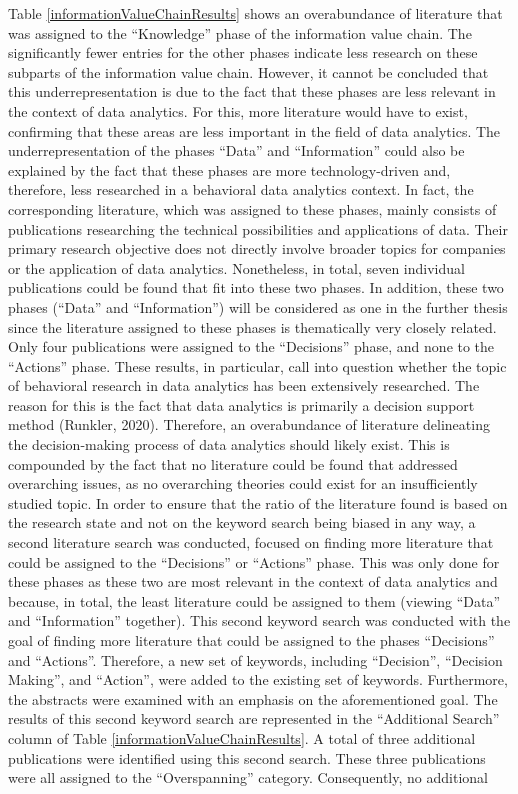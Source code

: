 Table \ref{informationValueChainResults} shows an overabundance of literature that was assigned to the \enquote{Knowledge} phase of the information value chain. The significantly fewer entries for the other phases indicate less research on these subparts of the information value chain. However, it cannot be concluded that this underrepresentation is due to the fact that these phases are less relevant in the context of data analytics. For this, more literature would have to exist, confirming that these areas are less important in the field of data analytics. The underrepresentation of the phases \enquote{Data} and \enquote{Information} could also be explained by the fact that these phases are more technology-driven and, therefore, less researched in a behavioral data analytics context. In fact, the corresponding literature, which was assigned to these phases, mainly consists of publications researching the technical possibilities and applications of data. Their primary research objective does not directly involve broader topics for companies or the application of data analytics. Nonetheless, in total, seven individual publications could be found that fit into these two phases. In addition, these two phases (\enquote{Data} and \enquote{Information}) will be considered as one in the further thesis since the literature assigned to these phases is thematically very closely related. Only four publications were assigned to the \enquote{Decisions} phase, and none to the \enquote{Actions} phase. These results, in particular, call into question whether the topic of behavioral research in data analytics has been extensively researched. The reason for this is the fact that data analytics is primarily a decision support method (Runkler, 2020). Therefore, an overabundance of literature delineating the decision-making process of data analytics should likely exist. This is compounded by the fact that no literature could be found that addressed overarching issues, as no overarching theories could exist for an insufficiently studied topic. In order to ensure that the ratio of the literature found is based on the research state and not on the keyword search being biased in any way, a second literature search was conducted, focused on finding more literature that could be assigned to the \enquote{Decisions} or \enquote{Actions} phase. This was only done for these phases as these two are most relevant in the context of data analytics and because, in total, the least literature could be assigned to them (viewing \enquote{Data} and \enquote{Information} together). This second keyword search was conducted with the goal of finding more literature that could be assigned to the phases \enquote{Decisions} and \enquote{Actions}. Therefore, a new set of keywords, including \enquote{Decision}, \enquote{Decision Making}, and \enquote{Action}, were added to the existing set of keywords. Furthermore, the abstracts were examined with an emphasis on the aforementioned goal. The results of this second keyword search are represented in the \enquote{Additional Search} column of Table \ref{informationValueChainResults}. A total of three additional publications were identified using this second search. These three publications were all assigned to the \enquote{Overspanning} category. Consequently, no additional 